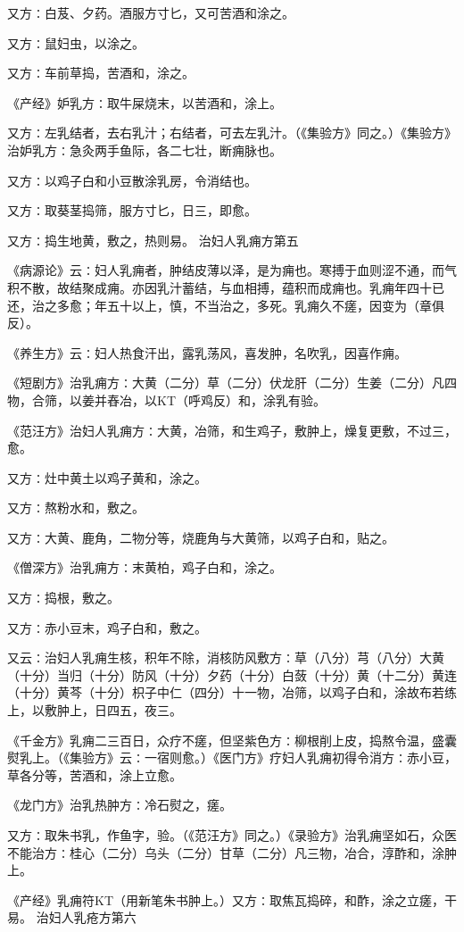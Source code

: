 \documentclass[a4paper,12pt,UTF8,twoside]{ctexbook}
\begin{document}
又方∶白芨、夕药。酒服方寸匕，又可苦酒和涂之。

又方∶鼠妇虫，以涂之。

又方∶车前草捣，苦酒和，涂之。

《产经》妒乳方∶取牛屎烧末，以苦酒和，涂上。

又方∶左乳结者，去右乳汁；右结者，可去左乳汁。（《集验方》同之。）《集验方》治妒乳方∶急灸两手鱼际，各二七壮，断痈脉也。

又方∶以鸡子白和小豆散涂乳房，令消结也。

又方∶取葵茎捣筛，服方寸匕，日三，即愈。

又方∶捣生地黄，敷之，热则易。
治妇人乳痈方第五

《病源论》云∶妇人乳痈者，肿结皮薄以泽，是为痈也。寒搏于血则涩不通，而气积不散，故结聚成痈。亦因乳汁蓄结，与血相搏，蕴积而成痈也。乳痈年四十已还，治之多愈；年五十以上，慎，不当治之，多死。乳痈久不瘥，因变为（章俱反）。

《养生方》云∶妇人热食汗出，露乳荡风，喜发肿，名吹乳，因喜作痈。

《短剧方》治乳痈方∶大黄（二分）草（二分）伏龙肝（二分）生姜（二分）凡四物，合筛，以姜并舂冶，以KT（呼鸡反）和，涂乳有验。

《范汪方》治妇人乳痈方∶大黄，冶筛，和生鸡子，敷肿上，燥复更敷，不过三，愈。

又方∶灶中黄土以鸡子黄和，涂之。

又方∶熬粉水和，敷之。

又方∶大黄、鹿角，二物分等，烧鹿角与大黄筛，以鸡子白和，贴之。

《僧深方》治乳痈方∶末黄柏，鸡子白和，涂之。

又方∶捣根，敷之。

又方∶赤小豆末，鸡子白和，敷之。

又云∶治妇人乳痈生核，积年不除，消核防风敷方∶草（八分）芎（八分）大黄（十分）当归（十分）防风（十分）夕药（十分）白蔹（十分）黄（十二分）黄连（十分）黄芩（十分）枳子中仁（四分）十一物，冶筛，以鸡子白和，涂故布若练上，以敷肿上，日四五，夜三。

《千金方》乳痈二三百日，众疗不瘥，但坚紫色方∶柳根削上皮，捣熬令温，盛囊熨乳上。（《集验方》云∶一宿则愈。）《医门方》疗妇人乳痈初得令消方∶赤小豆，草各分等，苦酒和，涂上立愈。

《龙门方》治乳热肿方∶冷石熨之，瘥。

又方∶取朱书乳，作鱼字，验。（《范汪方》同之。）《录验方》治乳痈坚如石，众医不能治方∶桂心（二分）乌头（二分）甘草（二分）凡三物，冶合，淳酢和，涂肿上。

《产经》乳痈符KT（用新笔朱书肿上。）又方∶取焦瓦捣碎，和酢，涂之立瘥，干易。
治妇人乳疮方第六
\end{document}
